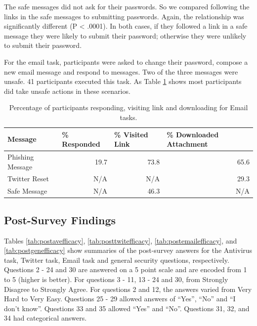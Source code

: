 The safe messages did not ask for their passwords. So we compared following the links in the safe messages to submitting passwords. Again, the relationship was significantly different (P < .0001). In both cases, if they followed a link in a safe message they were likely to submit their password; otherwise they were unlikely to submit their password.

For the email task, participants were asked to change their password, compose a new email message and respond to messages. Two of the three messages were unsafe. 41 participants executed this task. As Table \ref{tab:emailtask} shows most participants did take unsafe actions in these scenarios.

\begin{table}[ht]
\begin{tabular}{|l|r|r|r|}
\hline
Message & \multicolumn{1}{l|}{\% Responded} & \multicolumn{1}{l|}{\% Visited Link} & \multicolumn{1}{l|}{\% Downloaded Attachment} \\ \hline
Phishing Message & 19.7 & 73.8 & 65.6 \\
Twitter Reset    & N/A  & N/A  & 29.3 \\
Safe Message     & N/A  & 46.3 & N/A  \\ \hline
\end{tabular}
\caption{Percentage of participants responding, visiting link and downloading for Email tasks.}
\label{tab:emailtask}
\end{table}

\subsection{Post-Survey Findings}
Tables \ref{tab:postavefficacy}, \ref{tab:posttwitefficacy}, \ref{tab:postemailefficacy}, and \ref{tab:postgenefficacy} show summaries of the post-survey answers for the Antivirus task, Twitter task, Email task and general security questions, respectively. Questions 2 - 24 and 30 are answered on a 5 point scale and are encoded from 1 to 5 (higher is better). For questions 3 - 11, 13 - 24 and 30, from Strongly Disagree to Strongly Agree. For questions 2 and 12, the answers varied from Very Hard to Very Easy. Questions 25 - 29 allowed answers of ``Yes'', ``No'' and ``I don't know''. Questions 33 and 35 allowed ``Yes'' and ``No''. Questions 31, 32, and 34 had categorical answers.

